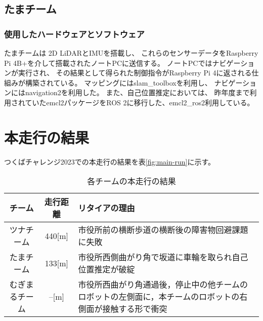 \documentclass[twocolumn,9pt]{jsproceedings}
\begin{document}
\subsection{たまチーム}\label{sub:localization}

\subsubsection{使用したハードウェアとソフトウェア}

たまチームは 2D LiDARとIMUを搭載し、
これらのセンサーデータをRaspberry Pi 4B+を介して搭載されたノートPCに送信する。
ノートPCではナビゲーションが実行され、
その結果として得られた制御指令がRaspberry Pi 4に返される仕組みが構築されている。
マッピングにはslam\_toolboxを利用し、
ナビゲーションにはnavigation2を利用した。
また、自己位置推定においては、
昨年度まで利用されていたemcl2パッケージをROS 2に移行した、emcl2\_ros2利用している。

\section{本走行の結果}

つくばチャレンジ2023での本走行の結果を表\ref{fig:main-run}に示す。

\begin{table}[h]
  \caption{各チームの本走行の結果}
  \label{MainRun}
  \begin{tabular}{|c|c|p{4.0cm}|}
    \hline
    チーム         & 走行距離 & リタイアの理由                                                                                             \\
    \hline
    ツナチーム     & 440[m]   & 市役所前の横断歩道の横断後の障害物回避課題に失敗                                                           \\
    \hline
    たまチーム     & 133[m]   & 市役所西側曲がり角で坂道に車輪を取られ自己位置推定が破綻                                                   \\
    \hline
    むぎまるチーム & --[m]    & 市役所西曲がり角通過後，停止中の他チームのロボットの左側面に，本チームのロボットの右側面が接触する形で衝突 \\
    \hline
  \end{tabular}
\end{table}
\end{document}

